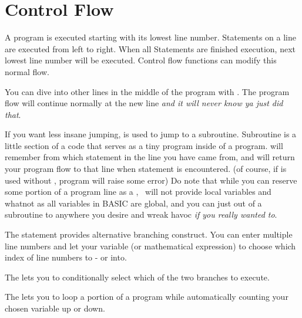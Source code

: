 \section{Control Flow}

A program is executed starting with its lowest line number. Statements on a line are executed from left to right. When all Statements are finished execution, next lowest line number will be executed. Control flow functions can modify this normal flow.

You can dive into other lines in the middle of the program with . The program flow will continue normally at the new line \emph{and it will never know ya just did that}.

If you want less insane jumping,  is used to jump to a subroutine. Subroutine is a little section of a code that serves as a tiny program inside of a program.  will remember from which statement in the line you have came from, and will return your program flow to that line when  statement is encountered. (of course, if  is used without , program will raise some error) Do note that while you can reserve some portion of a program line as a , \tbas\ will not provide local variables and whatnot as all variables in BASIC are global, and you can just  out of a subroutine to anywhere you desire and wreak havoc \emph{if you really wanted to}.

The  statement provides alternative branching construct. You can enter multiple line numbers and let your variable (or mathematical expression) to choose which index of line numbers to - or  into.

The  lets you to conditionally select which of the two branches to execute.

The  lets you to loop a portion of a program while automatically counting your chosen variable up or down.
